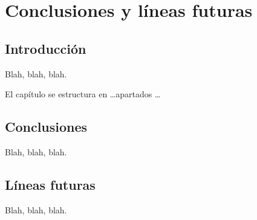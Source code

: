 
\chapter{Conclusiones y líneas futuras}
\label{cha:concl-y-line}


\section{Introducción}
\label{sec:introduccion-conclusiones}

Blah, blah, blah.

El capítulo se estructura en \ldots apartados \ldots



\section{Conclusiones}
\label{sec:conclusions}

Blah, blah, blah.



\section{Líneas futuras}
\label{sec:lineas-futuras}

Blah, blah, blah.





